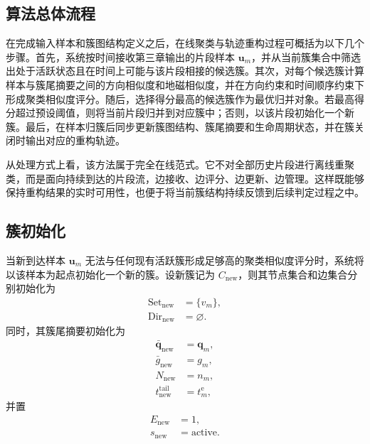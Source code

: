 \documentclass{xdupgthesis}
\begin{document}
\subsection{算法总体流程}

在完成输入样本和簇图结构定义之后，在线聚类与轨迹重构过程可概括为以下几个步骤。首先，系统按时间接收第三章输出的片段样本 $\mathbf{u}_m$，并从当前簇集合中筛选出处于活跃状态且在时间上可能与该片段相接的候选簇。其次，对每个候选簇计算样本与簇尾摘要之间的方向相似度和地磁相似度，并在方向约束和时间顺序约束下形成聚类相似度评分。随后，选择得分最高的候选簇作为最优归并对象。若最高得分超过预设阈值，则将当前片段归并到对应簇中；否则，以该片段初始化一个新簇。最后，在样本归簇后同步更新簇图结构、簇尾摘要和生命周期状态，并在簇关闭时输出对应的重构轨迹。

从处理方式上看，该方法属于完全在线范式。它不对全部历史片段进行离线重聚类，而是面向持续到达的片段流，边接收、边评分、边更新、边管理。这样既能够保持重构结果的实时可用性，也便于将当前簇结构持续反馈到后续判定过程之中。


\subsection{簇初始化}

当新到达样本 $\mathbf{u}_m$ 无法与任何现有活跃簇形成足够高的聚类相似度评分时，系统将以该样本为起点初始化一个新的簇。设新簇记为 $C_{\mathrm{new}}$，则其节点集合和边集合分别初始化为
\begin{equation}
	\begin{aligned}
		\mathrm{Set}_{\mathrm{new}}&=\{v_m\},\\
		\mathrm{Dir}_{\mathrm{new}}&=\varnothing.
	\end{aligned}
\end{equation}
同时，其簇尾摘要初始化为
\begin{equation}
	\begin{aligned}
		\bar{\mathbf{q}}_{\mathrm{new}}&=\mathbf{q}_m,\\
		\bar{g}_{\mathrm{new}}&=g_m,\\
		N_{\mathrm{new}}&=n_m,\\
		t_{\mathrm{new}}^{\mathrm{tail}}&=t_m^{\mathrm{e}},
	\end{aligned}
\end{equation}
并置
\begin{equation}
	\begin{aligned}
		E_{\mathrm{new}}&=1,\\
		s_{\mathrm{new}}&=\mathrm{active}.
	\end{aligned}
\end{equation}
\end{document}
